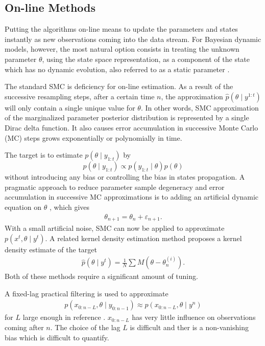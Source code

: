 


\subsection{On-line Methods}

Putting the algorithms on-line means to update the parameters and states instantly as new observations coming into the data stream. For Bayesian dynamic models, however, the most natural option consists in treating the unknown parameter $\theta$, using the state space representation, as a component of the state which has no dynamic evolution, also referred to as a static parameter \cite{cappe2007overview}. 

The standard SMC is deficiency for on-line estimation. As a result of the successive resampling steps, after a certain time $n$, the approximation $\hat{p}(\theta\mid y^{1:t})$ will only contain a single unique value for $\theta$. In other words, SMC approximation of the marginalized parameter posterior distribution is represented by a single Dirac delta
function. It also causes error accumulation in successive Monte Carlo (MC) steps grows exponentially or polynomially in time.

The target is to estimate $p(\theta \mid y_{1:t})$ by
\begin{equation}
p(\theta \mid y_{1:t}) \propto p(y_{1:t} \mid \theta ) p(\theta )
\end{equation}
without introducing any bias or controlling the bias in states propagation. A pragmatic approach to reduce parameter sample degeneracy and error accumulation in successive MC approximations is to adding an artificial dynamic equation on $\theta$ \cite{higuchi2001self} \cite{kitagawa1998self}, which gives
\begin{align*}
\theta_{n+1} = \theta_n+\varepsilon_{n+1}.
\end{align*}
With a small artificial noise, SMC can now be applied to approximate $p(x^t,\theta\mid y^t)$. A related kernel density estimation method proposes a kernel density estimate of the target \cite{liu2001combined} \begin{align*}
\hat{p}(\theta\mid y^t) = \frac{1}{N}\sum M(\theta-\theta_n^{(i)}). 
\end{align*} 
Both of these methods require a significant amount of tuning.

A fixed-lag practical filtering is used to approximate
\begin{align*}
p(x_{0:n-L},\theta\mid y_{0:n-1})\approx p(x_{0:n-L},\theta \mid y^n)
\end{align*}
for $L$ large enough in reference \cite{polson2008practical}. $x_{0:n-L}$ has very little influence on observations coming after $n$. The choice of the lag $L$ is difficult and ther is a non-vanishing bias which is difficult to quantify.

